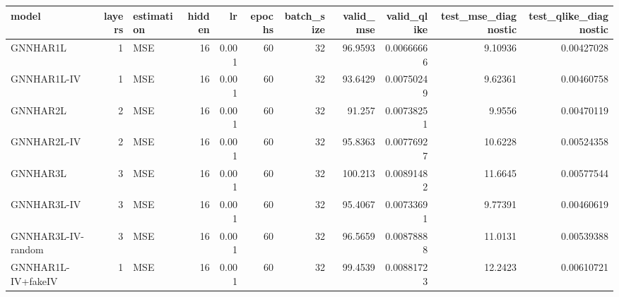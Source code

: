 \begin{tabular}{lrlrrrrrrrr}
\toprule
model & layers & estimation & hidden & lr & epochs & batch_size & valid_mse & valid_qlike & test_mse_diagnostic & test_qlike_diagnostic \\
\midrule
GNNHAR1L & 1 & MSE & 16 & 0.001 & 60 & 32 & 96.9593 & 0.00666666 & 9.10936 & 0.00427028 \\
GNNHAR1L-IV & 1 & MSE & 16 & 0.001 & 60 & 32 & 93.6429 & 0.00750249 & 9.62361 & 0.00460758 \\
GNNHAR2L & 2 & MSE & 16 & 0.001 & 60 & 32 & 91.257 & 0.00738251 & 9.9556 & 0.00470119 \\
GNNHAR2L-IV & 2 & MSE & 16 & 0.001 & 60 & 32 & 95.8363 & 0.00776927 & 10.6228 & 0.00524358 \\
GNNHAR3L & 3 & MSE & 16 & 0.001 & 60 & 32 & 100.213 & 0.00891482 & 11.6645 & 0.00577544 \\
GNNHAR3L-IV & 3 & MSE & 16 & 0.001 & 60 & 32 & 95.4067 & 0.00733691 & 9.77391 & 0.00460619 \\
GNNHAR3L-IV-random & 3 & MSE & 16 & 0.001 & 60 & 32 & 96.5659 & 0.00878888 & 11.0131 & 0.00539388 \\
GNNHAR1L-IV+fakeIV & 1 & MSE & 16 & 0.001 & 60 & 32 & 99.4539 & 0.00881723 & 12.2423 & 0.00610721 \\
\bottomrule
\end{tabular}
